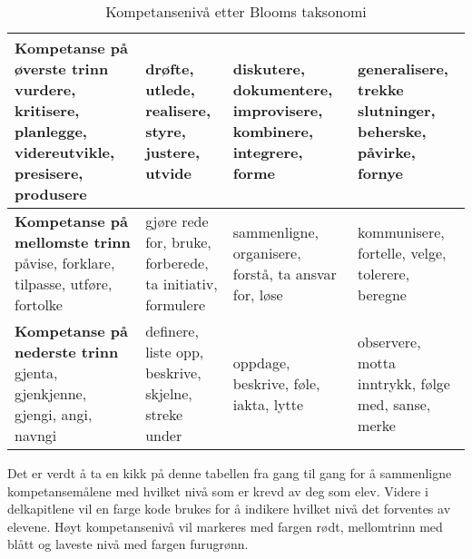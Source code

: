 \documentclass[main.tex]{subfiles}
\begin{document}
\begin{table}
\label{tab:kompetansenivå}
\centering
\begin{tabular}{ | m{6cm} | m{6cm}| m{6cm} | m{6cm}} 
\hline
\textbf{Kompetanse på øverste trinn} 
{\color{red}vurdere, kritisere, planlegge, videreutvikle, presisere, produsere} & {\color{red}drøfte, utlede, realisere, styre, justere, utvide} & {\color{red}diskutere, dokumentere, improvisere, kombinere, integrere, forme} & {\color{red} generalisere, trekke slutninger, beherske, påvirke, fornye}\\ 
\hline
\textbf{Kompetanse på mellomste trinn} 
{\color{blue}påvise, forklare, tilpasse, utføre, fortolke} & {\color{blue}gjøre rede for, bruke, forberede, ta initiativ, formulere} & {\color{blue}sammenligne, organisere, forstå, ta ansvar for, løse} & {\color{blue}kommunisere, fortelle, velge, tolerere, beregne} \\ 
\hline
\textbf{Kompetanse på nederste trinn} 
{\color{PineGreen}gjenta, gjenkjenne, gjengi, angi, navngi} & {\color{PineGreen}definere, liste opp, beskrive, skjelne, streke under} & {\color{PineGreen}oppdage, beskrive, føle, iakta, lytte} & {\color{PineGreen}observere, motta inntrykk, følge med, sanse, merke}\\ 
\hline
\end{tabular}
\caption{Kompetansenivå etter Blooms taksonomi}
\end{table}
Det er verdt å ta en kikk på denne tabellen fra gang til gang for å sammenligne kompetansemålene med hvilket nivå som er krevd av deg som elev. Videre i delkapitlene vil en farge kode brukes for å indikere hvilket nivå det forventes av elevene. Høyt kompetansenivå vil markeres med fargen {\color{red}rødt}, mellomtrinn med {\color{blue}blått} og laveste nivå med fargen {\color{PineGreen}furugrønn}.
\end{document}

